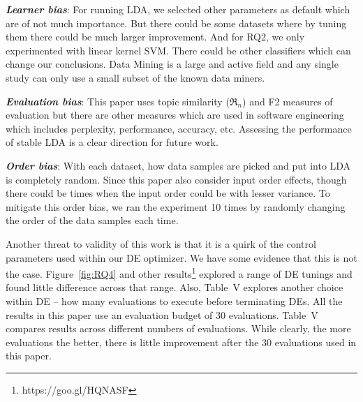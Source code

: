 \documentclass[twocolumn,5p,sort&compress]{elsarticle}
\newcommand{\bi}{\begin{itemize}}
\newcommand{\ei}{\end{itemize}}
\theoremstyle{break}
\begin{document}
\textbf{\textit{Learner bias}}: For running LDA, we selected other parameters as default which are of not much importance. But there could be some datasets where by tuning them there could be much larger improvement. And for RQ2, we only experimented with linear kernel SVM. There could be other classifiers which can change our conclusions. Data Mining is a large and active field and any single study can only use a small subset of the known data miners.

\textbf{\textit{Evaluation bias}}: This paper uses topic similarity ($\Re_n$) and F2 measures of evaluation but there are other measures which are used in software engineering which
includes perplexity, performance, accuracy, etc. Assessing
the performance of stable LDA is a clear direction for future work.

\textbf{\textit{Order bias}}: With each dataset, how data samples are picked and put into LDA is completely random. Since this paper also consider input order effects, though there could be times when the input order could be with lesser variance. To mitigate this order bias, we ran the experiment 10 times by randomly changing the order of the data samples each time.


Another threat to validity of this work is that it is a quirk of the control
parameters used within our DE optimizer.
We have some evidence that this is not the case.
Figure~\ref{fig:RQ4} and other results\footnote{https://goo.gl/HQNASF} explored a range of DE tunings and found
little difference across that range. Also, Table~V explores another choice within DE -- how
many evaluations to execute before terminating DEs. All the results in this paper use an
evaluation budget of 30 evaluations. Table~V
compares results across different numbers of evaluations. While clearly,
the more evaluations the better, there is little improvement after the 30 evaluations used in this paper. 

\end{document}

